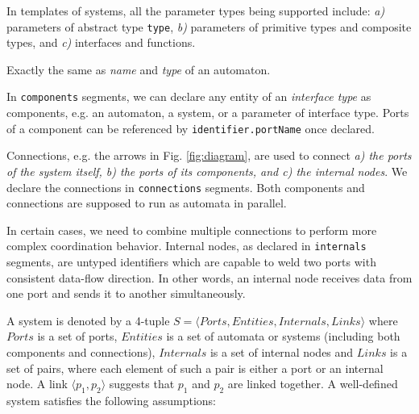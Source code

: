  In templates of systems, all the parameter types being supported include: \emph{a)} parameters of abstract type \texttt{type}, \emph{b)} parameters of primitive types and composite types, and \emph{c)} interfaces and functions.

 Exactly the same as \emph{name} and \emph{type} of an automaton.

 In \texttt{components} segments, we can declare any entity of an \emph{interface type} as components, e.g. an automaton, a system, or a parameter of interface type. 
Ports of a component can be referenced by \texttt{identifier.portName} once declared.

 Connections, e.g. the arrows in Fig. \ref{fig:diagram}, are used to connect \emph{a) the ports of the system itself, b) the ports of its components, and c) the internal nodes}. We declare the connections in \texttt{connections} segments.
Both components and connections are supposed to run as automata in parallel.

 In certain cases, we need to combine multiple connections to perform more complex coordination behavior. Internal nodes, as declared in \texttt{internals} segments, are untyped identifiers which are capable to weld two ports with consistent data-flow direction. In other words, an internal node receives data from one port and sends it to another simultaneously.


A system is denoted by a 4-tuple
$S=\langle Ports, Entities, Internals, Links\rangle$ where $Ports$ is a set of ports, $Entities$ is a set of automata or systems (including both components and connections), $Internals$ is a set of internal nodes and $Links$ is a set of pairs, where each element of such a pair is either a port or an internal node. A link $\langle p_1,p_2\rangle$ suggests that $p_1$ and $p_2$ are linked together. A well-defined system satisfies the following assumptions:

